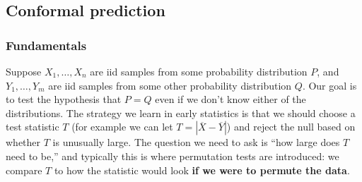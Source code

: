 \subsection{Conformal prediction}
\subsubsection{Fundamentals}
Suppose $X_1, \ldots, X_n$ are iid samples from some probability distribution $P$, and $Y_1, \ldots, Y_m$ are iid samples from some other probability distribution $Q$. Our goal is to test the hypothesis that $P = Q$ even if we don't know either of the distributions.
The strategy we learn in early statistics is that we should choose a test statistic $T$ (for example we can let $T = |\overline{X} - \overline{Y}|$) and reject the null based on whether $T$ is unusually large. The question we need to ask is ``how large does $T$ need to be,'' and typically this is where permutation tests are introduced: we compare $T$ to how the statistic would look \textbf{if we were to permute the data}.

